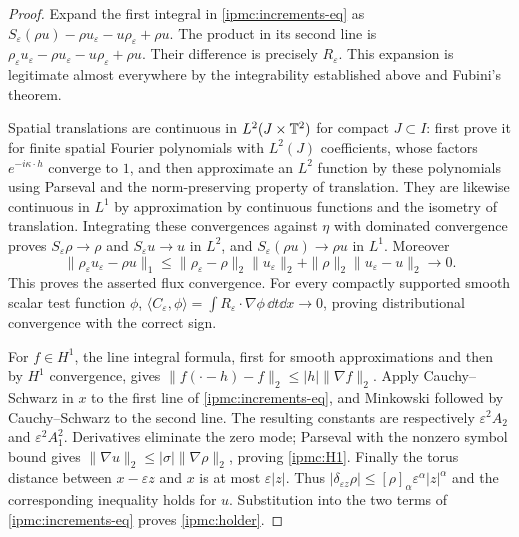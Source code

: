 \begin{proof}
Expand the first integral in \eqref{ipmc:increments-eq} as
$S_\varepsilon(\rho u)-\rho u_\varepsilon-u\rho_\varepsilon+\rho u$.
The product in its second line is
$\rho_\varepsilon u_\varepsilon-\rho u_\varepsilon-u\rho_\varepsilon+\rho u$.
Their difference is precisely $R_\varepsilon$. This expansion is legitimate
almost everywhere by the integrability established above and Fubini's theorem.

Spatial translations are continuous in $L^2(J\times\mathbb T^2)$ for compact $J\subset I$:
first prove it for finite spatial Fourier polynomials with $L^2(J)$ coefficients,
whose factors $e^{-i\kappa\cdot h}$ converge to $1$, and then approximate an
$L^2$ function by these polynomials using Parseval and the norm-preserving
property of translation. They are likewise continuous in $L^1$ by approximation
by continuous functions and the isometry of translation. Integrating these
convergences against $\eta$ with dominated convergence proves
$S_\varepsilon\rho\to\rho$ and $S_\varepsilon u\to u$ in $L^2$, and
$S_\varepsilon(\rho u)\to\rho u$ in $L^1$. Moreover
\[
\|\rho_\varepsilon u_\varepsilon-\rho u\|_1
\le\|\rho_\varepsilon-\rho\|_2\|u_\varepsilon\|_2
+\|\rho\|_2\|u_\varepsilon-u\|_2\longrightarrow0.
\]
This proves the asserted flux convergence. For every compactly supported
smooth scalar test function $\phi$,
$\langle C_\varepsilon,\phi\rangle
=\int R_\varepsilon\cdot\nabla\phi\,\dd t\dd x\to0$,
proving distributional convergence with the correct sign.

For $f\in H^1$, the line integral formula, first for smooth approximations
and then by $H^1$ convergence, gives
$\|f(\cdot-h)-f\|_2\le |h|\|\nabla f\|_2$.
Apply Cauchy--Schwarz in $x$ to the first line of
\eqref{ipmc:increments-eq}, and Minkowski followed by Cauchy--Schwarz
to the second line. The resulting constants are respectively
$\varepsilon^2 A_2$ and $\varepsilon^2 A_1^2$.
Derivatives eliminate the zero mode; Parseval with the nonzero symbol bound
gives $\|\nabla u\|_2\le|\sigma|\|\nabla\rho\|_2$, proving \eqref{ipmc:H1}.
Finally the torus distance between $x-\varepsilon z$ and $x$ is at most
$\varepsilon|z|$. Thus
$|\delta_{\varepsilon z}\rho|\le[\rho]_\alpha\varepsilon^\alpha|z|^\alpha$
and the corresponding inequality holds for $u$. Substitution into the two
terms of \eqref{ipmc:increments-eq} proves \eqref{ipmc:holder}.
\end{proof}

